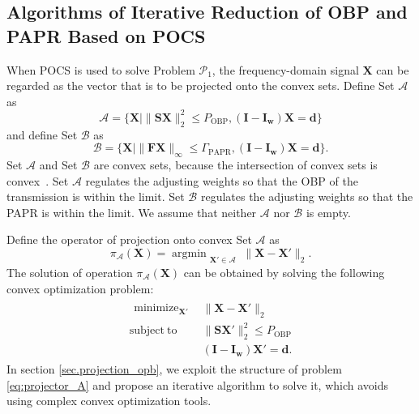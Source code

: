 \documentclass[paper]{ieice}
\begin{document}
\subsection{Algorithms of Iterative Reduction of OBP and PAPR Based on POCS}

When POCS is used to solve Problem $\mathcal{P}_1$, the frequency-domain signal $\mathbf{X}$ can be regarded as the vector that is to be projected onto the convex sets. Define Set $\mathcal{A}$ as
\begin{equation}
\mathcal{A} = \{ \mathbf{X} \mid \|\mathbf{S}\mathbf{X}\|_{2}^2 \leq P_{\mathrm{OBP}}, (\mathbf{I}-\mathbf{I}_\mathbf{w})\mathbf{X} = \mathbf{d}\}
\end{equation}
and define Set $\mathcal{B}$ as
\begin{equation}
\mathcal{B} = \{ \mathbf{X} \mid \| \mathbf{F}\mathbf{X}\|_{\infty} \leq \Gamma_{\mathrm{PAPR}}, (\mathbf{I} -\mathbf{I}_\mathbf{w})\mathbf{X} = \mathbf{d} \}.
\end{equation}
Set $\mathcal{A}$ and Set $\mathcal{B}$ are convex sets, because the intersection of convex sets is convex~\cite{ConvexOpt_Boyd}.  Set $\mathcal{A}$ regulates the adjusting weights so that the OBP of the transmission is within the limit.  Set $\mathcal{B}$ regulates the adjusting weights so that the PAPR is within the limit.  We assume that neither $\mathcal{A}$ nor $\mathcal{B}$ is empty. 

Define the operator of projection onto convex Set $\mathcal{A}$ as
\begin{equation}
\pi_{\mathcal{A}}(\mathbf{X}) = \mathop{\mathrm{argmin}}_{\substack{\mathbf{X}' \in \mathcal{A}}} \|\mathbf{X}-\mathbf{X}'\|_2 \label{eq:projection_obp}.
\end{equation}
The solution of operation $\pi_{\mathcal{A}}(\mathbf{X})$ can be obtained by solving the following convex optimization problem:
\begin{eqnarray}
\begin{array}{ll}
\begin{split}
\mathop{\mathrm{minimize}}_{\mathbf{X}'}
\end{split}  
& \|\mathbf{X}-\mathbf{X}'\|_2 \\
\mathrm{subject~to} & \|\mathbf{S}\mathbf{X}' \|_{2}^2 \leq P_{\mathrm{OBP}} \\
&(\mathbf{I}-\mathbf{I}_{\mathbf{w}})\mathbf{X}' = \mathbf{d}.
\end{array} \label{eq:projector_A}
\end{eqnarray}
In section \ref{sec.projection_opb}, we exploit the structure of problem \eqref{eq:projector_A} and propose an iterative algorithm to solve it, which avoids using complex convex optimization tools.
\end{document}
